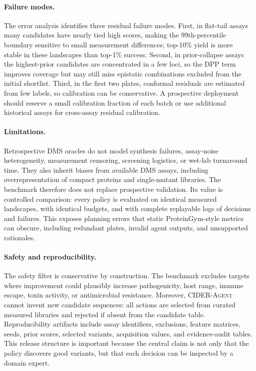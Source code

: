\documentclass{article}
\newcommand{\agent}{\textsc{CIDER-Agent}}
\newcommand{\topone}{top-1\%}
\newcommand{\topten}{top-10\%}
\newcommand{\dms}{DMS}
\begin{document}
\paragraph{Failure modes.} The error analysis identifies three residual failure modes. First, in flat-tail assays many candidates have nearly tied high scores, making the 99th-percentile boundary sensitive to small measurement differences; \topten{} yield is more stable in these landscapes than \topone{} success. Second, in prior-collapse assays the highest-prior candidates are concentrated in a few loci, so the DPP term improves coverage but may still miss epistatic combinations excluded from the initial shortlist. Third, in the first two plates, conformal residuals are estimated from few labels, so calibration can be conservative. A prospective deployment should reserve a small calibration fraction of each batch or use additional historical assays for cross-assay residual calibration.

\paragraph{Limitations.} Retrospective \dms{} oracles do not model synthesis failures, assay-noise heterogeneity, measurement censoring, screening logistics, or wet-lab turnaround time. They also inherit biases from available \dms{} assays, including overrepresentation of compact proteins and single-mutant libraries. The benchmark therefore does not replace prospective validation. Its value is controlled comparison: every policy is evaluated on identical measured landscapes, with identical budgets, and with complete replayable logs of decisions and failures. This exposes planning errors that static ProteinGym-style metrics can obscure, including redundant plates, invalid agent outputs, and unsupported rationales.

\paragraph{Safety and reproducibility.} The safety filter is conservative by construction. The benchmark excludes targets where improvement could plausibly increase pathogenicity, host range, immune escape, toxin activity, or antimicrobial resistance. Moreover, \agent{} cannot invent new candidate sequences: all actions are selected from curated measured libraries and rejected if absent from the candidate table. Reproducibility artifacts include assay identifiers, exclusions, feature matrices, seeds, prior scores, selected variants, acquisition values, and evidence-audit tables. This release structure is important because the central claim is not only that the policy discovers good variants, but that each decision can be inspected by a domain expert.
\end{document}
